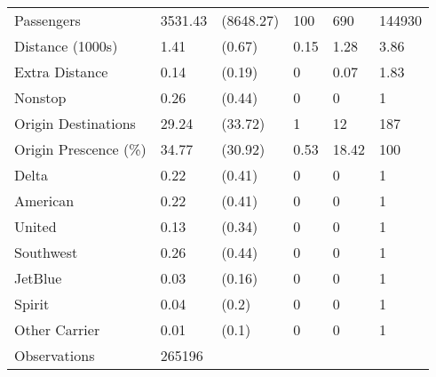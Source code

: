 \begin{tabular}[t]{llllll}
\hspace{1em}Passengers & 3531.43 & (8648.27) & 100 & 690 & 144930\\
\hspace{1em}Distance (1000s) & 1.41 & (0.67) & 0.15 & 1.28 & 3.86\\
\hspace{1em}Extra Distance & 0.14 & (0.19) & 0 & 0.07 & 1.83\\
\hspace{1em}Nonstop & 0.26 & (0.44) & 0 & 0 & 1\\
\hspace{1em}Origin Destinations & 29.24 & (33.72) & 1 & 12 & 187\\
\hspace{1em}Origin Prescence (\%) & 34.77 & (30.92) & 0.53 & 18.42 & 100\\
\hspace{1em}Delta & 0.22 & (0.41) & 0 & 0 & 1\\
\hspace{1em}American & 0.22 & (0.41) & 0 & 0 & 1\\
\hspace{1em}United & 0.13 & (0.34) & 0 & 0 & 1\\
\hspace{1em}Southwest & 0.26 & (0.44) & 0 & 0 & 1\\
\hspace{1em}JetBlue & 0.03 & (0.16) & 0 & 0 & 1\\
\hspace{1em}Spirit & 0.04 & (0.2) & 0 & 0 & 1\\
\hspace{1em}Other Carrier & 0.01 & (0.1) & 0 & 0 & 1\\
\hspace{1em}Observations & 265196 &  &  &  & \\
\bottomrule
\end{tabular}
